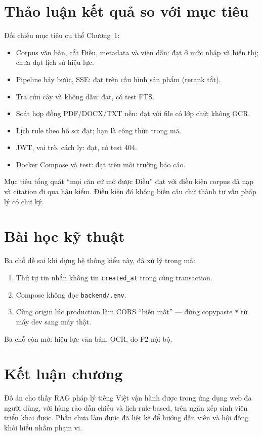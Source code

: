 \section{Thảo luận kết quả so với mục tiêu}

Đối chiếu mục tiêu cụ thể Chương~1:

\begin{itemize}
    \item Corpus \soLuat{} văn bản, cắt Điều, metadata và viện dẫn: đạt ở mức
    nhập và hiển thị; chưa đạt lịch sử hiệu lực.
    \item Pipeline bảy bước, SSE: đạt trên cấu hình sản phẩm (rerank tắt).
    \item Tra cứu cây và không dấu: đạt, có test FTS.
    \item Soát hợp đồng PDF/DOCX/TXT nền: đạt với file có lớp chữ; không OCR.
    \item Lịch \soRule{} rule theo hồ sơ: đạt; hạn là công thức trong mã.
    \item JWT, vai trò, cách ly: đạt, có test 404.
    \item Docker Compose và \soTest{} test: đạt trên môi trường báo cáo.
\end{itemize}

Mục tiêu tổng quát ``mọi căn cứ mở được Điều'' đạt với điều kiện corpus đã nạp
và citation đi qua hậu kiểm. Điều kiện đó không biến câu chữ thành tư vấn pháp
lý có chữ ký.

\section{Bài học kỹ thuật}

Ba chỗ dễ sai khi dựng hệ thống kiểu này, đã xử lý trong mã:

\begin{enumerate}
    \item Thứ tự tin nhắn không tin \texttt{created\_at} trong cùng transaction.
    \item Compose không đọc \texttt{backend/.env}.
    \item Cùng origin lúc production làm CORS ``biến mất'' --- đừng copypaste
    \texttt{*} từ máy dev sang máy thật.
\end{enumerate}

Ba chỗ còn mở: hiệu lực văn bản, OCR, đo F2 nội bộ.

\section{Kết luận chương}

Đồ án cho thấy RAG pháp lý tiếng Việt vận hành được trong ứng dụng web đa người
dùng, với hàng rào dẫn chiếu và lịch rule-based, trên ngăn xếp sinh viên triển
khai được. Phần chưa làm được đã liệt kê để hướng dẫn viên và hội đồng khỏi
hiểu nhầm phạm vi.

